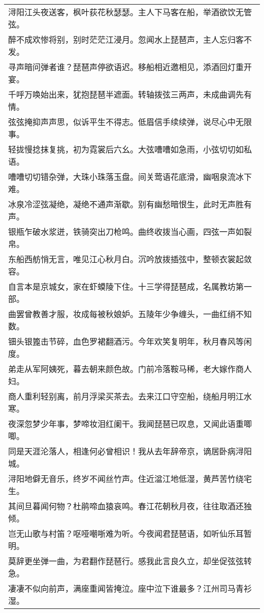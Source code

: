 \nopagebreak%
\nopagebreak%
\noindent\begin{minipage}{\linewidth}
  \vskip-3pt\begin{table}[H]
    \centering
    \begin{tabular}{@{}l@{}}
浔阳江头夜送客，枫叶荻花秋瑟瑟。主人下马客在船，举酒欲饮无管弦。\\
醉不成欢惨将别，别时茫茫江浸月。忽闻水上琵琶声，主人忘归客不发。\\
寻声暗问弹者谁？琵琶声停欲语迟。移船相近邀相见，添酒回灯重开宴。\\
千呼万唤始出来，犹抱琵琶半遮面。转轴拨弦三两声，未成曲调先有情。\\
弦弦掩抑声声思，似诉平生不得志。低眉信手续续弹，说尽心中无限事。\\
轻拢慢捻抹复挑，初为霓裳后六幺。大弦嘈嘈如急雨，小弦切切如私语。\\
嘈嘈切切错杂弹，大珠小珠落玉盘。间关莺语花底滑，幽咽泉流冰下难。\\
冰泉冷涩弦凝绝，凝绝不通声渐歇。别有幽愁暗恨生，此时无声胜有声。\\
银瓶乍破水浆迸，铁骑突出刀枪鸣。曲终收拨当心画，四弦一声如裂帛。\\
东船西舫悄无言，唯见江心秋月白。沉吟放拨插弦中，整顿衣裳起敛容。\\
自言本是京城女，家在虾蟆陵下住。十三学得琵琶成，名属教坊第一部。\\
曲罢曾教善才服，妆成每被秋娘妒。五陵年少争缠头，一曲红绡不知数。\\
钿头银篦击节碎，血色罗裙翻酒污。今年欢笑复明年，秋月春风等闲度。\\
弟走从军阿姨死，暮去朝来颜色故。门前冷落鞍马稀，老大嫁作商人妇。\\
商人重利轻别离，前月浮梁买茶去。去来江口守空船，绕船月明江水寒。\\
夜深忽梦少年事，梦啼妆泪红阑干。我闻琵琶已叹息，又闻此语重唧唧。\\
同是天涯沦落人，相逢何必曾相识！我从去年辞帝京，谪居卧病浔阳城。\\
浔阳地僻无音乐，终岁不闻丝竹声。住近湓江地低湿，黄芦苦竹绕宅生。\\
其间旦暮闻何物？杜鹃啼血猿哀鸣。春江花朝秋月夜，往往取酒还独倾。\\
岂无山歌与村笛？呕哑嘲哳难为听。今夜闻君琵琶语，如听仙乐耳暂明。\\
莫辞更坐弹一曲，为君翻作琵琶行。感我此言良久立，却坐促弦弦转急。\\
凄凄不似向前声，满座重闻皆掩泣。座中泣下谁最多？江州司马青衫湿。
    \end{tabular}
  \end{table}
\end{minipage}
\vspace{1cm}



